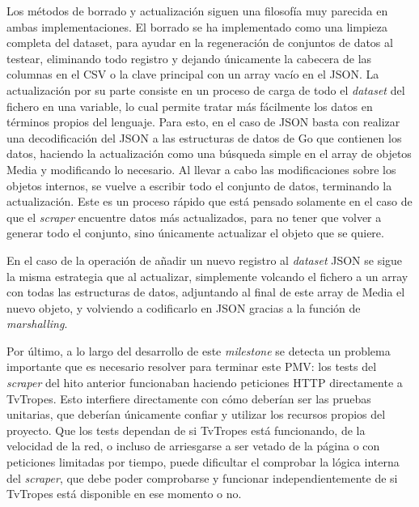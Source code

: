 Los métodos de borrado y actualización siguen una filosofía muy parecida en
ambas implementaciones. El borrado se ha implementado como una limpieza completa
del dataset, para ayudar en la regeneración de conjuntos de datos al testear,
eliminando todo registro y dejando únicamente la cabecera de las columnas en el
CSV o la clave principal con un array vacío en el JSON. La actualización por su
parte consiste en un proceso de carga de todo el \textit{dataset} del fichero en
una variable, lo cual permite tratar más fácilmente los datos en términos
propios del lenguaje. Para esto, en el caso de JSON basta con realizar una
decodificación del JSON a las estructuras de datos de Go que contienen los
datos, haciendo la actualización como una búsqueda simple en el array de objetos
Media y modificando lo necesario. Al llevar a cabo las modificaciones sobre los
objetos internos, se vuelve a escribir todo el conjunto de datos, terminando la
actualización. Este es un proceso rápido que está pensado solamente en el
caso de que el \textit{scraper} encuentre datos más actualizados, para no tener
que volver a generar todo el conjunto, sino únicamente actualizar el objeto que
se quiere.

En el caso de la operación de añadir un nuevo registro al \textit{dataset} JSON
se sigue la misma estrategia que al actualizar, simplemente volcando el fichero
a un array con todas las estructuras de datos, adjuntando al final de este array
de Media el nuevo objeto, y volviendo a codificarlo en JSON gracias a la función
de \textit{marshalling}.

Por último, a lo largo del desarrollo de este \textit{milestone} se detecta un
problema importante que es necesario resolver para terminar este PMV: los tests
del \textit{scraper} del hito anterior funcionaban haciendo peticiones HTTP
directamente a TvTropes. Esto interfiere directamente con cómo deberían ser las
pruebas unitarias, que deberían únicamente confiar y utilizar los recursos
propios del proyecto. Que los tests dependan de si TvTropes está funcionando, de
la velocidad de la red, o incluso de arriesgarse a ser vetado de la página o con
peticiones limitadas por tiempo, puede dificultar el comprobar la lógica interna
del \textit{scraper}, que debe poder comprobarse y funcionar independientemente
de si TvTropes está disponible en ese momento o no.

